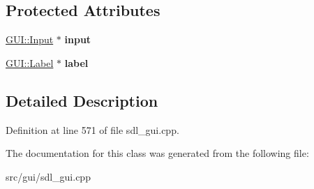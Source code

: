 \subsection*{Protected Attributes}
\begin{DoxyCompactItemize}
\item 
\hypertarget{classPropertyEditorString_a01df4231c719d774740cc9dcb24682d5}{\hyperlink{classGUI_1_1Input}{G\-U\-I\-::\-Input} $\ast$ {\bfseries input}}\label{classPropertyEditorString_a01df4231c719d774740cc9dcb24682d5}

\item 
\hypertarget{classPropertyEditorString_aed882563f5dadc31f75d3facaf0df144}{\hyperlink{classGUI_1_1Label}{G\-U\-I\-::\-Label} $\ast$ {\bfseries label}}\label{classPropertyEditorString_aed882563f5dadc31f75d3facaf0df144}

\end{DoxyCompactItemize}


\subsection{Detailed Description}


Definition at line 571 of file sdl\-\_\-gui.\-cpp.



The documentation for this class was generated from the following file\-:\begin{DoxyCompactItemize}
\item 
src/gui/sdl\-\_\-gui.\-cpp\end{DoxyCompactItemize}
